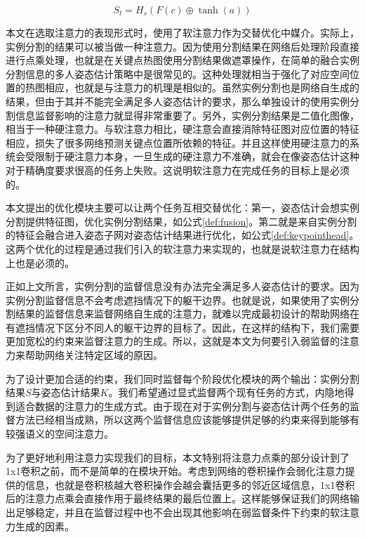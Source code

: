 \begin{equation}
\label{def:fusion}
S_t = H_s(F(c) \oplus \tanh(a))
\end{equation}

本文在选取注意力的表现形式时，使用了软注意力作为交替优化中媒介。实际上，实例分割的结果可以被当做一种注意力。因为使用分割结果在网络后处理阶段直接进行点乘处理，也就是在关键点热图使用分割结果做遮罩操作，在简单的融合实例分割信息的多人姿态估计策略中是很常见的。这种处理就相当于强化了对应空间位置的热图相应，也就是与注意力的机理是相似的。虽然实例分割也是网络自生成的结果，但由于其并不能完全满足多人姿态估计的要求，那么单独设计的使用实例分割信息监督影响的注意力就显得非常重要了。另外，实例分割结果是二值化图像，相当于一种硬注意力。与软注意力相比，硬注意会直接消除特征图对应位置的特征相应，损失了很多网络预测关键点位置所依赖的特征。并且这样使用硬注意力的系统会受限制于硬注意力本身，一旦生成的硬注意力不准确，就会在像姿态估计这种对于精确度要求很高的任务上失败。这说明软注意力在完成任务的目标上是必须的。

本文提出的优化模块主要可以让两个任务互相交替优化：第一，姿态估计会想实例分割提供特征图，优化实例分割结果，如公式\eqref{def:fusion}。第二就是来自实例分割的特征会融合进入姿态子网对姿态估计结果进行优化，如公式\eqref{def:keypointhead}。这两个优化的过程是通过我们引入的软注意力来实现的，也就是说软注意力在结构上也是必须的。

正如上文所言，实例分割的监督信息没有办法完全满足多人姿态估计的要求。因为实例分割监督信息不会考虑遮挡情况下的躯干边界。也就是说，如果使用了实例分割结果的监督信息来监督网络自生成的注意力，就难以完成最初设计的帮助网络在有遮挡情况下区分不同人的躯干边界的目标了。因此，在这样的结构下，我们需要更加宽松的约束来监督注意力的生成。所以，这就是本文为何要引入弱监督的注意力来帮助网络关注特定区域的原因。

为了设计更加合适的约束，我们同时监督每个阶段优化模块的两个输出：实例分割结果$S$与姿态估计结果$K$。我们希望通过显式监督两个现有任务的方式，内隐地得到适合数据的注意力的生成方式。由于现在对于实例分割与姿态估计两个任务的监督方法已经相当成熟，所以这两个监督信息应该能够提供足够的约束来得到能够有较强语义的空间注意力。

为了更好地利用注意力实现我们的目标，本文特别将注意力点乘的部分设计到了1x1卷积之前，而不是简单的在模块开始。考虑到网络的卷积操作会弱化注意力提供的信息，也就是卷积核越大卷积操作会越会囊括更多的邻近区域信息，1x1卷积后的注意力点乘会直接作用于最终结果的最后位置上。这样能够保证我们的网络输出足够稳定，并且在监督过程中也不会出现其他影响在弱监督条件下约束的软注意力生成的因素。

